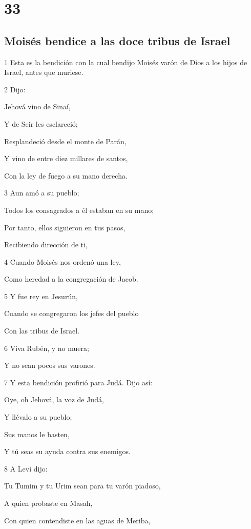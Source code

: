 \chapter{33}

\section*{Moisés bendice a las doce tribus de Israel}

\par 1 Esta es la bendición con la cual bendijo Moisés varón de Dios a los hijos de Israel, antes que muriese.
\par 2 Dijo:
\par Jehová vino de Sinaí,
\par Y de Seir les esclareció;
\par Resplandeció desde el monte de Parán,
\par Y vino de entre diez millares de santos,
\par Con la ley de fuego a su mano derecha. 
\par 3 Aun amó a su pueblo;
\par Todos los consagrados a él estaban en su mano;
\par Por tanto, ellos siguieron en tus pasos,
\par Recibiendo dirección de ti,
\par 4 Cuando Moisés nos ordenó una ley,
\par Como heredad a la congregación de Jacob.
\par 5 Y fue rey en Jesurún,
\par Cuando se congregaron los jefes del pueblo
\par Con las tribus de Israel.
\par 6 Viva Rubén, y no muera;
\par Y no sean pocos sus varones.
\par 7 Y esta bendición profirió para Judá. Dijo así:
\par Oye, oh Jehová, la voz de Judá,
\par Y llévalo a su pueblo;
\par Sus manos le basten,
\par Y tú seas su ayuda contra sus enemigos.
\par 8 A Leví dijo:
\par Tu Tumim y tu Urim sean para tu varón piadoso,
\par A quien probaste en Masah, 
\par Con quien contendiste en las aguas de Meriba, 

